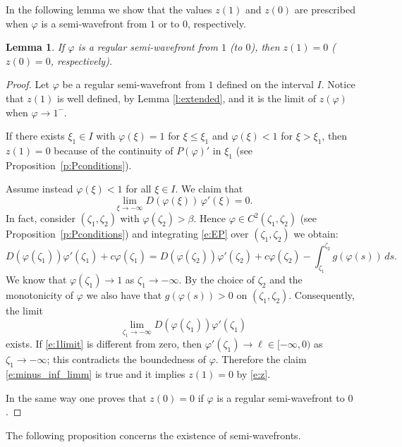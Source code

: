 \documentclass[11pt,a4paper]{article}
\newtheorem{lemma}{Lemma}[section]
\renewcommand{\phi}{\varphi}
\begin{document}
In the following lemma we show that the values $z(1)$ and $z(0)$ are prescribed
when $\phi$ is a semi-wavefront from $1$ or to $0$, respectively.  

\begin{lemma}\label{l:z1z0} If $\phi$ is a regular semi-wavefront from $1$ (to $0$), then  $z(1)=0$ ($z(0)=0$, respectively).
\end{lemma}
\begin{proof} Let $\phi$ be a regular semi-wavefront from $1$ defined on the interval $I$. Notice that $z(1)$ is well defined, by Lemma \ref{l:extended}, and it is  the limit of $z(\phi)$ when $\phi \to 1^-$. 

If there exists $\xi_1 \in I$ with $\phi(\xi)=1$ for $\xi \le \xi_1$ and $\phi(\xi)<1$ for $\xi > \xi_1$, then $z(1)=0$ because of the continuity of $P(\phi)'$ in $\xi_1$ (see Proposition~\ref{p:Pconditions}). 

Assume instead $\phi(\xi)<1$ for all $\xi \in I$. We claim that
\begin{equation}\label{e:minus_inf_limm}
\lim_{\xi \to -\infty} D\left(\phi(\xi)\right)\,\phi'(\xi) = 0.
\end{equation}
In fact, consider $(\zeta_1,\zeta_2)$ with $\phi(\zeta_2)>\beta$. Hence $\phi \in C^2(\zeta_1, \zeta_2)$ (see Proposition~\ref{p:Pconditions}) and integrating \eqref{e:EP} over $(\zeta_1,\zeta_2)$  we obtain:
\[
D\left(\phi(\zeta_1)\right)\phi'(\zeta_1)+c\phi(\zeta_1)
= D\left(\phi(\zeta_2)\right)\phi'(\zeta_2)+ c\phi(\zeta_2) -\int_{\zeta_1}^{\zeta_2} g\left(\phi(s)\right)\,ds.
\]
We know that $\phi(\zeta_1) \to 1$ as $\zeta_1 \to -\infty$. 
By the choice of $\zeta_2$ and the monotonicity of $\phi$ we also have that $g(\phi(s))>0$ on $(\zeta_1,\zeta_2)$. 
Consequently, the limit 
\begin{equation}\label{e:1limit}
\lim_{\zeta_1 \to -\infty} D(\phi(\zeta_1))\phi'(\zeta_1)
\end{equation}
exists. 
If \eqref{e:1limit} is different from zero, then $\phi'(\zeta_1) \to \ell\in [-\infty, 0)$ as $\zeta_1\to-\infty$; this contradicts the boundedness of $\phi$. Therefore the claim \eqref{e:minus_inf_limm} is true and it implies $z(1)=0$ by \eqref{e:z}. 

In the same way one proves that $z(0)=0$ if $\phi$ is a regular semi-wavefront to $0$.
\end{proof}
The following proposition concerns the existence of semi-wavefronts.
\end{document}
